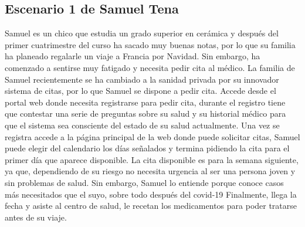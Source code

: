 \subsection{Escenario 1 de Samuel Tena}
    Samuel es un chico que estudia un grado superior en cerámica y después del primer
    cuatrimestre del curso ha sacado muy buenas notas, por lo que su familia ha planeado
    regalarle un viaje a Francia por Navidad. Sin embargo, ha comenzado a sentirse muy fatigado
     y necesita pedir cita al médico. La familia de Samuel recientemente
    se ha cambiado a la sanidad privada por su innovador sistema de citas, por lo que Samuel se
    dispone a pedir cita. Accede desde el portal web donde necesita registrarse para pedir cita,
    durante el registro tiene que contestar una serie de preguntas sobre su salud y su historial
    médico para que el sistema sea consciente del estado de su salud actualmente. Una vez se registra
    accede a la página principal de la web donde puede solicitar citas, Samuel puede elegir del calendario
    los días señalados y termina pidiendo la cita para el primer día que aparece disponible. La cita disponible
    es para la semana siguiente, ya que, dependiendo de su riesgo no necesita urgencia al ser una persona joven y sin problemas de salud.
    Sin embargo, Samuel lo entiende porque conoce casos más necesitados que el suyo, sobre todo después del covid-19
    Finalmente, llega la fecha y asiste al centro de salud, le recetan los medicamentos para poder tratarse antes de su viaje.


